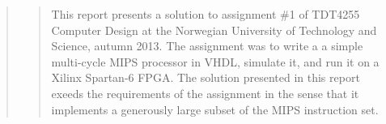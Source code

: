 \begin{quote}
\begin{quote}
This report presents a solution to assignment \#1 of TDT4255 Computer Design at the Norwegian University of Technology and Science, autumn 2013.
The assignment was to write a a simple multi-cycle MIPS processor in VHDL, simulate it, and run it on a Xilinx Spartan-6 FPGA.
The solution presented in this report exeeds the requirements of the assignment in the sense that it implements a generously large subset of the MIPS instruction set.
\end{quote}
\end{quote}
